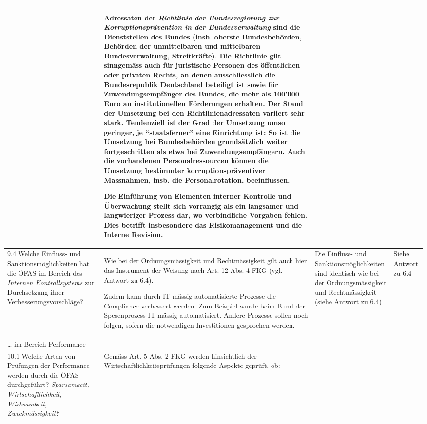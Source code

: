 \documentclass[10pt]{article}
\begin{document}
\begin{landscape}
\begin{center}
\begin{longtable}{|p{4cm}|p{5cm}|p{7.5cm}|p{7.5cm}|}
 & Adressaten der \textit{Richtlinie der Bundesregierung zur Korruptionsprävention in der Bundesverwaltung} sind die Dienststellen des Bundes (insb. oberste Bundesbehörden, Behörden der unmittelbaren und mittelbaren Bundesverwaltung, Streitkräfte). Die Richtlinie gilt sinngemäss auch für juristische Personen des öffentlichen oder privaten Rechts, an denen ausschliesslich die Bundesrepublik Deutschland beteiligt ist sowie für Zuwendungsempfänger des Bundes, die mehr als 100'000 Euro an institutionellen Förderungen erhalten. Der Stand der Umsetzung bei den Richtlinienadressaten variiert sehr stark. Tendenziell ist der Grad der Umsetzung umso geringer, je “{}staatsferner”{} eine Einrichtung ist: So ist die Umsetzung bei Bundesbehörden grundsätzlich weiter fortgeschritten als etwa bei Zuwendungs­empfän­gern. Auch die vorhandenen Personalressourcen können die Umsetzung bestimmter korrup­tionspräventiver Massnahmen, insb. die Personalrotation, beeinflussen.

Die Einführung von Elementen interner Kontrolle und Über­wachung stellt sich vorrangig als ein langsamer und langwieriger Prozess dar, wo verbindliche Vorgaben fehlen. Dies betrifft insbesondere das Risiko­management und die Interne Revision.

 \\
\hline
9.4 Welche Einfluss- und Sanktionsmöglichkeiten hat die ÖFAS im Bereich des \textit{Internen Kontrollsystems} zur Durchsetzung ihrer Verbesserungsvorschläge? & Wie bei der Ordnungsmässigkeit und Rechtmässigkeit gilt auch hier das Instrument der Weisung nach Art. 12 Abs. 4 FKG (vgl. Antwort zu 6.4).

Zudem kann durch IT-mässig automatisierte Prozesse die Compliance verbessert werden. Zum Beispiel wurde beim Bund der Spesenprozess IT-mässig automatisiert. Andere Prozesse sollen noch folgen, sofern die notwendigen Investitionen gesprochen werden.

 & Die Einfluss- und Sanktions­möglichkeiten sind identisch wie bei der Ordnungsmässigkeit und Rechtmässigkeit (siehe Antwort zu 6.4) & Siehe Antwort zu 6.4

 \\
\hline
… im Bereich Performance &  &  &  \\
\hline
10.1 Welche Arten von Prüfungen der Performance werden durch die ÖFAS durchgeführt? \textit{Sparsamkeit, Wirtschaftlichkeit, Wirksamkeit, Zweckmässigkeit?} & Gemäss Art. 5 Abs. 2 FKG werden hinsichtlich der Wirtschaftlichkeitsprüfungen folgende Aspekte geprüft, ob:


\end{longtable}
\end{center}
\end{landscape}
\end{document}

